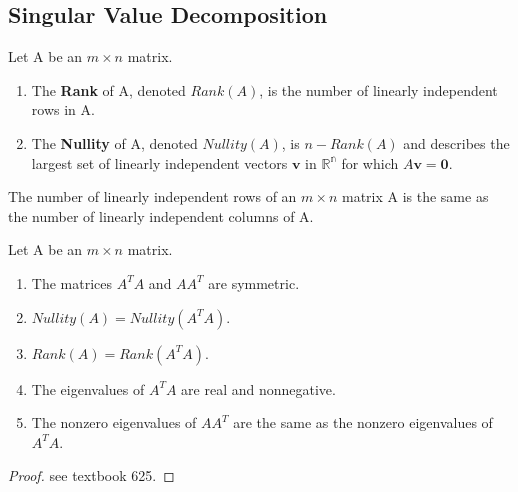 \subsection{Singular Value Decomposition}
\begin{definition}
	Let A be an $m\times n$ matrix.
	\begin{enumerate}
		\item 
		The \textbf{Rank} of A, denoted $Rank(A)$, is the number of linearly independent rows in A.
		\item 
		The \textbf{Nullity} of A, denoted $Nullity(A)$, is $n - Rank(A)$ and describes the largest set of linearly independent vectors $\mathbf{v}$ in $\mathbb{R^n}$ for which $A\mathbf{v} = \mathbf{0}$.
	\end{enumerate}
\end{definition}

\begin{thm}
	The number of linearly independent rows of an $m \times n$ matrix A is the same as the number of linearly independent columns of A.
\end{thm}

\begin{thm}
	Let A be an $m\times n$ matrix.
	\begin{enumerate}
		\item The matrices $A^TA$ and $AA^T$ are symmetric.
		\item $Nullity(A) = Nullity(A^TA)$.
		\item $Rank(A) = Rank(A^TA)$.
		\item The eigenvalues of $A^TA$ are real and nonnegative.
		\item The nonzero eigenvalues of $AA^T$ are the same as the nonzero eigenvalues of $A^TA$.
	\end{enumerate}
\end{thm}
\begin{proof}
	see textbook 625.
\end{proof}

